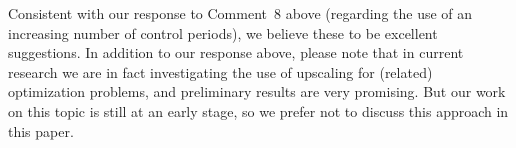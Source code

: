 \documentclass{article}
\begin{document}
\begin{enumerate}
Consistent with our response to Comment~8 above (regarding the use of an increasing number of control periods), we believe these to be excellent suggestions. In addition to our response above, please note that in current research we are in fact investigating the use of upscaling for (related) optimization problems, and preliminary results are very promising. But our work on this topic is still at an early stage, so we prefer not to discuss this approach in this paper.



 \end{enumerate}
\end{document}
